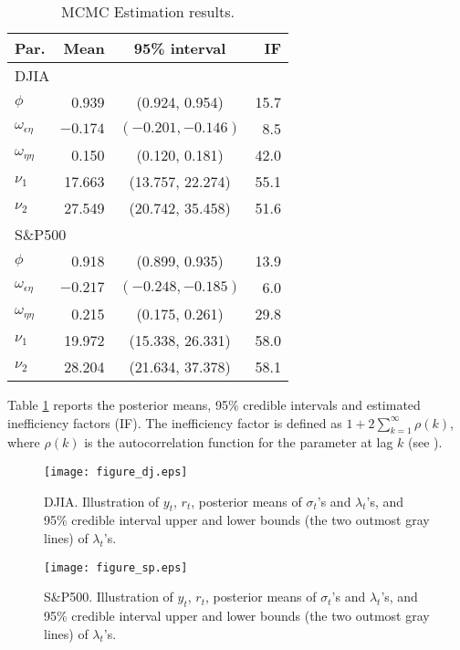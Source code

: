 \documentclass[11pt]{article}
\begin{document}
\begin{table} 
\caption{MCMC Estimation results. 
\label{table:4.2}} 
\begin{center}
\begin{tabular}{lrcr} \hline
Par. & Mean & 95\% interval 
& IF \\ \hline
\multicolumn{4}{l}{DJIA} \\
$\phi$ & 0.939 & (0.924, 0.954) 
& 15.7 \\
$\omega_{\epsilon\eta}$ & $-0.174$ & $(-0.201, -0.146)$ 
& 8.5 \\ 
$\omega_{\eta\eta}$ & 0.150 &  (0.120, 0.181) 
& 42.0 \\
$\nu_1$ & 17.663 & (13.757, 22.274) 
& 55.1 \\
$\nu_2$ & 27.549 & (20.742, 35.458) 
& 51.6 \\ \hline 
\multicolumn{4}{l}{S\&P500} \\
$\phi$ & 0.918 & (0.899, 0.935) 
& 13.9 \\
$\omega_{\epsilon\eta}$ & $-0.217$ & $(-0.248, -0.185)$ 
& 6.0 \\
$\omega_{\eta\eta}$ & 0.215 & (0.175, 0.261) 
& 29.8 \\ 
$\nu_1$ & 19.972 & (15.338, 26.331) 
& 58.0 \\
$\nu_2$ & 28.204 & (21.634, 37.378) 
& 58.1 \\ \hline
\end{tabular}
\end{center}
\end{table}

Table \ref{table:4.2} reports the posterior means, 95\% credible intervals
and estimated inefficiency factors (IF).  
The inefficiency factor is defined as $1+2\sum_{k=1}^\infty \rho(k)$, where $\rho(k)$ is the autocorrelation function for the parameter at lag $k$ (see \cite{Chib(2001)}). 

\begin{figure}
\begin{center}
\caption{DJIA. Illustration of $y_t$, $r_t$, posterior means of $\sigma_t$'s and $\lambda_t$'s, and 95\% credible interval upper and lower bounds (the two outmost gray lines) of $\lambda_t$'s. \label{fig:4.2-a}}
\texttt{[image: figure\_dj.eps]}
\end{center}
\end{figure}

\begin{figure}
\begin{center}
\caption{S\&P500. Illustration of $y_t$, $r_t$, posterior means of $\sigma_t$'s and $\lambda_t$'s, and 95\% credible interval upper and lower bounds (the two outmost gray lines) of $\lambda_t$'s. \label{fig:4.2-b}}
\texttt{[image: figure\_sp.eps]}
\end{center}
\end{figure}
\end{document}
